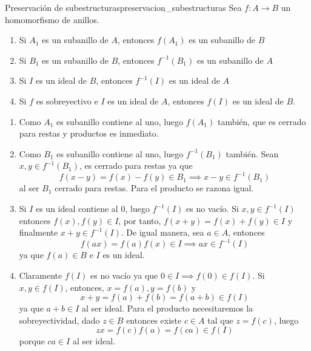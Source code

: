 \begin{proposition}{Preservación de subestructuras}{preservacion_subestructuras}
    Sea \(f: A \to B\) un homomorfismo de anillos.
    \begin{enumerate}
        \item Si \(A_1\) es un subanillo de \(A\), entonces \(f(A_1)\) es un subanillo de \(B\)
        \item Si \(B_1\) es un subanillo de \(B\), entonces \(f^{-1}(B_1)\) es un subanillo de \(A\)
        \item Si \(I\) es un ideal de \(B\), entonces \(f^{-1}(I)\) es un ideal de \(A\)
        \item Si \(f\) es sobreyectivo e \(I\) es un ideal de \(A\), entonces \(f(I)\) es un ideal de \(B\).
    \end{enumerate}
\end{proposition}

\begin{proofbox}
    \begin{enumerate}
        \item Como $A_1$ es subanillo contiene al uno, luego $f(A_1)$ también, que es cerrado para restas y productos es inmediato.
        \item Como $B_1$ es subanillo contiene al uno, luego $f^{-1}(B_1)$ también. Sean $x, y \in f^{-1}(B_1)$, es cerrado para restas ya que
        \[
            f(x - y) = f(x) - f(y) \in B_1 \implies x - y \in f^{-1}(B_1)
        \]
        al ser $B_1$ cerrado para restas. Para el producto se razona igual.
        \item Si \(I\) es un ideal contiene al $0$, luego \(f^{-1}(I)\) es no vacío. Si $x,y \in f^{-1}(I)$ entonces $f(x),f(y) \in I$, por tanto, $f(x + y) = f(x) + f(y) \in I$ y finalmente $x + y \in f^{-1}(I)$. De igual manera, sea $a \in A$, entonces
        \[
        f(ax) = f(a)f(x) \in I \implies ax \in f^{-1}(I)
        \]
        ya que $f(a) \in B$ e $I$ es un ideal.
        \item Claramente $f(I)$ es no vacío ya que $0\in I \implies f(0)\in f(I)$. Si $x,y \in f(I)$, entonces, $x = f(a), y = f(b)$ y 
        \[
        x + y = f(a) + f(b) = f(a + b) \in f(I)
        \]
        ya que $a + b \in I$ al ser ideal. Para el producto necesitaremos la sobreyectividad, dado $z \in B$ entonces existe $c\in A$ tal que $z = f(c)$, luego
        \[
        zx = f(c)f(a) = f(ca) \in f(I)
        \]
        porque $ca \in I$ al ser ideal.

    \end{enumerate}
\end{proofbox}

